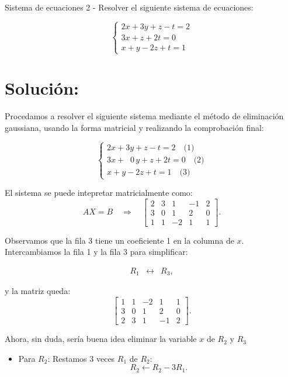 \documentclass[11pt,letterpaper]{article}
\begin{document}
\begin{inciso}{Sistema de ecuaciones 2}
- Resolver el siguiente sistema de ecuaciones:

\[
\begin{cases}
2x + 3y + z - t = 2 \\
3x + z + 2t = 0 \\
x + y - 2z + t = 1
\end{cases}
\]

\section*{Solución:}

Procedamos a resolver el siguiente sistema mediante el método de eliminación gaussiana, usando la forma matricial y realizando la comprobación final:

\[
\begin{cases}
2x + 3y + z - t = 2 \quad\text{(1)}\\[1mm]
3x + \;\;0\,y + z + 2t = 0 \quad\text{(2)}\\[1mm]
x + y - 2z + t = 1 \quad\text{(3)}
\end{cases}
\]


El sistema se puede intepretar matricialmente como:
\[
AX = B \quad\Longrightarrow\quad \left[\begin{array}{cccc|c}
2 & 3 & 1 & -1 & 2 \\
3 & 0 & 1 & 2 & 0 \\
1 & 1 & -2 & 1 & 1
\end{array}\right].
\]

Observamos que la fila 3 tiene un coeficiente 1 en la columna de \(x\). Intercambiamos la fila 1 y la fila 3 para simplificar:

\[
\begin{array}{rcl}
R_1 &\leftrightarrow& R_3,
\end{array}
\]

y la matriz queda:
\[
\left[\begin{array}{cccc|c}
1 & 1 & -2 & 1 & 1 \\[1mm]
3 & 0 & 1 & 2 & 0 \\[1mm]
2 & 3 & 1 & -1 & 2
\end{array}\right].
\]

Ahora, sin duda, sería buena idea eliminar la variable \(x\) de \(R_2\) y \(R_3\)

\begin{itemize}
    \item Para \(R_2\):  
      Restamos 3 veces \(R_1\) de \(R_2\):
      \[
      R_2 \leftarrow R_2 - 3R_1.
      \]


\end{itemize}
\end{inciso}
\end{document}
